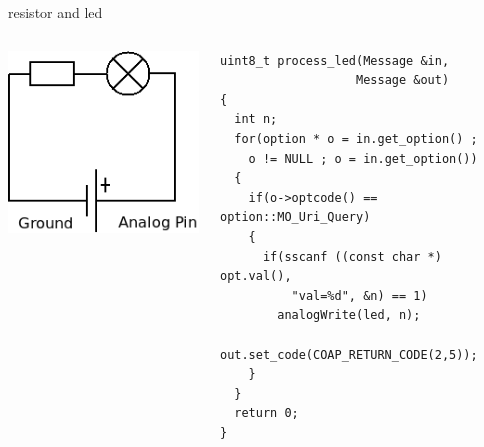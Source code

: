 \begin{frame}[containsverbatim]{resistor and led}
	\begin{columns}[c,onlytextwidth]
		\begin{column}[c]{.5\textwidth}
			\begin{center}
				\includegraphics [width=.9\textwidth,keepaspectratio]{img/resistor_led_analog.png}
			\end{center}
		\end{column}
		\begin{column}[c]{.5\textwidth}
\begin{Verbatim}[fontsize=\scriptsize]
uint8_t process_led(Message &in, 
	               Message &out) 
{
  int n;
  for(option * o = in.get_option() ; 
    o != NULL ; o = in.get_option())
  {
    if(o->optcode() == option::MO_Uri_Query)
    {
      if(sscanf ((const char *) opt.val(), 
          "val=%d", &n) == 1)
      	analogWrite(led, n);
      out.set_code(COAP_RETURN_CODE(2,5));
    }
  }
  return 0;
}
\end{Verbatim}
		\end{column}
	\end{columns}
\end{frame}


